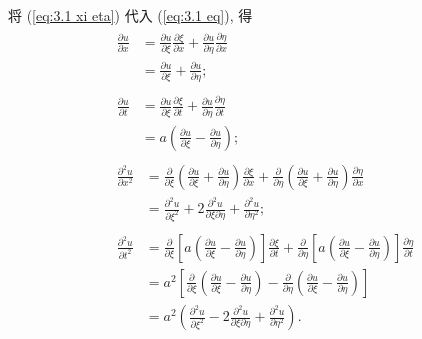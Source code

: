 将 (\ref{eq:3.1 xi eta}) 代入 (\ref{eq:3.1 eq}), 得
\begin{align}
     & \begin{aligned}
           \frac{\partial u}{\partial x}
            & =\frac{\partial u}{\partial\xi}\frac{\partial\xi}{\partial x}+\frac{\partial u}{\partial\eta}\frac{\partial\eta}{\partial x} \\
            & =\frac{\partial u}{\partial\xi}+\frac{\partial u}{\partial\eta};
       \end{aligned}                                                                                                                                                                               \\
     & \begin{aligned}
           \frac{\partial u}{\partial t}
            & =\frac{\partial u}{\partial\xi}\frac{\partial\xi}{\partial t}+\frac{\partial u}{\partial\eta}\frac{\partial\eta}{\partial t} \\
            & =a\left(\frac{\partial u}{\partial\xi}-\frac{\partial u}{\partial\eta}\right);
       \end{aligned}                                                                                                                                                                               \\
     & \begin{aligned}
           \frac{\partial^2u}{\partial x^2}
            & =\frac{\partial}{\partial\xi}\left(\frac{\partial u}{\partial\xi}+\frac{\partial u}{\partial\eta}\right)\frac{\partial\xi}{\partial x}+\frac{\partial}{\partial\eta}\left(\frac{\partial u}{\partial\xi}+\frac{\partial u}{\partial\eta}\right)\frac{\partial\eta}{\partial x} \\
            & =\frac{\partial^2u}{\partial\xi^2}+2\frac{\partial^2u}{\partial\xi\partial\eta}+\frac{\partial^2u}{\partial\eta^2};
       \end{aligned} \label{eq:3.1 u_xx}                             \\
     & \begin{aligned}
           \frac{\partial^2u}{\partial t^2}
            & =\frac{\partial}{\partial\xi}\left[a\left(\frac{\partial u}{\partial\xi}-\frac{\partial u}{\partial\eta}\right)\right]\frac{\partial\xi}{\partial t}+\frac{\partial}{\partial\eta}\left[a\left(\frac{\partial u}{\partial\xi}-\frac{\partial u}{\partial\eta}\right)\right]\frac{\partial\eta}{\partial t} \\
            & =a^2\left[\frac{\partial}{\partial\xi}\left(\frac{\partial u}{\partial\xi}-\frac{\partial u}{\partial\eta}\right)-\frac{\partial}{\partial\eta}\left(\frac{\partial u}{\partial\xi}-\frac{\partial u}{\partial\eta}\right)\right]                                                                          \\
            & =a^2\left(\frac{\partial^2u}{\partial\xi^2}-2\frac{\partial^2u}{\partial\xi\partial\eta}+\frac{\partial^2u}{\partial\eta^2}\right).
       \end{aligned} \label{eq:3.1 u_tt}
\end{align}
